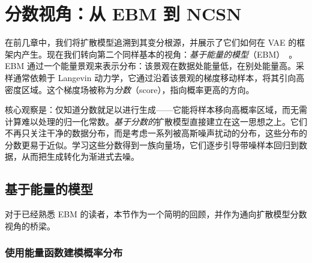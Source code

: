 \chapter{分数视角：从 EBM 到 NCSN}\label{ch:score-based}


在前几章中，我们将扩散模型追溯到其变分根源，并展示了它们如何在 VAE 的框架内产生。现在我们转向第二个同样基本的视角：\emph{基于能量的模型}（EBM）~\citep{ackley1985learning,lecun2006tutorial}。EBM 通过一个能量景观来表示分布：该景观在数据处能量低，在别处能量高。采样通常依赖于 Langevin 动力学，它通过沿着该景观的梯度移动样本，将其引向高密度区域。这个梯度场被称为\emph{分数}（score），指向概率更高的方向。

核心观察是：仅知道分数就足以进行生成——它能将样本移向高概率区域，而无需计算难以处理的归一化常数。\emph{基于分数的}扩散模型直接建立在这一思想之上。它们不再只关注干净的数据分布，而是考虑一系列被高斯噪声扰动的分布，这些分布的分数更易于近似。学习这些分数得到一族向量场，它们逐步引导带噪样本回归到数据，从而把生成转化为渐进式去噪。





\newpage


\section{基于能量的模型}\label{sec:ebm}

对于已经熟悉 EBM 的读者，本节作为一个简明的回顾，并作为通向扩散模型分数视角的桥梁。
\subsection{使用能量函数建模概率分布}

